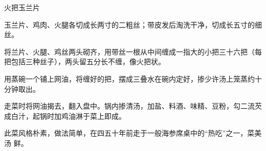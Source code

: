 %
%
%
%
%
%
%
\begin{recipe}{火把玉兰片}

\ingredients


\preparation

\step 玉兰片、鸡肉、火腿各切成长两寸的二粗丝；带皮发后淘洗干净，切成长五寸的细
丝。

\step 将兰片、火腿、鸡丝两头砌齐，用带丝一根从中间缠成一指大的小把三十六把（每
把包括三种丝子），两头留五分长不缠，像火把状。

\step 用蒸碗一个铺上网油，将缠好的把，摆成三叠水在碗内定好，掺少许汤上笼蒸约十
分钟取出。

\step 走菜时将网油揭去，翻入盘中。锅内掺清汤，加盐、料酒、味精、豆粉，勾二流芡
成白汁，起锅时加鸡油淋于菜上即成。

\features

此菜风格朴素，做法简单，在四五十年前走于一般海参席桌中的“热吃”之一，菜美汤
鲜。

\end{recipe}

